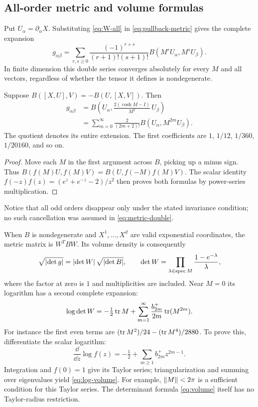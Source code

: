 \subsection{All-order metric and volume formulas}
Put $U_\alpha=\partial_\alpha X$. Substituting \cref{eq:W-all} in \cref{eq:pullback-metric} gives the complete expansion
\begin{equation}\label{eq:metric-double}
 g_{\alpha\beta}
 =\sum_{r,s\geq0}\frac{(-1)^{r+s}}{(r+1)!(s+1)!}
 B(M^rU_\alpha,M^sU_\beta).
\end{equation}
In finite dimension this double series converges absolutely for every $M$ and all vectors, regardless of whether the tensor it defines is nondegenerate.

\begin{proposition}\label{prop:metric-even}
Suppose $B([X,U],V)=-B(U,[X,V])$. Then
\begin{align}
 g_{\alpha\beta}
 &=B\left(U_\alpha,\frac{2(\cosh M-I)}{M^2}\,U_\beta\right)\label{eq:metric-entire}\\
 &=\sum_{m=0}^{\infty}\frac{2}{(2m+2)!}
 B(U_\alpha,M^{2m}U_\beta).\label{eq:metric-all}
\end{align}
The quotient denotes its entire extension. The first coefficients are $1$, $1/12$, $1/360$, $1/20160$, and so on.
\end{proposition}
\begin{proof}
Move each $M$ in the first argument across $B$, picking up a minus sign. Thus
$B(f(M)U,f(M)V)=B(U,f(-M)f(M)V)$.
The scalar identity
$f(-z)f(z)=(e^z+e^{-z}-2)/z^2$
then proves both formulas by power-series multiplication.
\end{proof}
Notice that all odd orders disappear only under the stated invariance condition; no such cancellation was assumed in \cref{eq:metric-double}.

When $B$ is nondegenerate and $X^1,\ldots,X^d$ are valid exponential coordinates, the metric matrix is $W^TBW$. Its volume density is consequently
\begin{equation}\label{eq:volume}
 \sqrt{\left\lvert \det g\right\rvert}=\left\lvert \det W\right\rvert\sqrt{\left\lvert \det B\right\rvert},\qquad
 \det W=\prod_{\lambda\in\operatorname{spec} M}\frac{1-e^{-\lambda}}{\lambda},
\end{equation}
where the factor at zero is $1$ and multiplicities are included. Near $M=0$ its logarithm has a second complete expansion:
\begin{equation}\label{eq:log-volume}
 \log\det W=-\tfrac12\operatorname{tr} M+
 \sum_{m=1}^{\infty}\frac{b^+_{2m}}{2m}\operatorname{tr}(M^{2m}).
\end{equation}
For instance the first even terms are $(\operatorname{tr} M^2)/24-(\operatorname{tr} M^4)/2880$.
To prove this, differentiate the scalar logarithm:
\begin{equation}
 \frac{\dd}{\dd z}\log f(z)
 =-\tfrac12+\sum_{m\geq1}b^+_{2m}z^{2m-1}.
\end{equation}
Integration and $f(0)=1$ give its Taylor series; triangularization and summing over eigenvalues yield \cref{eq:log-volume}. For example, $\left\lVert M\right\rVert<2\pi$ is a sufficient condition for this Taylor series. The determinant formula \cref{eq:volume} itself has no Taylor-radius restriction.
